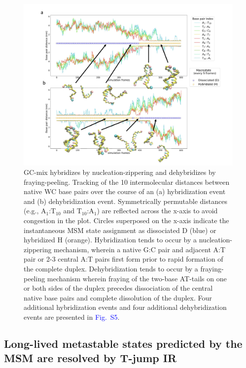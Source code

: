 \documentclass[journal=jpcbfk,manuscript=article]{achemso}
\newcommand*{\blauw}[1]{\textcolor{blue}{#1}}
\begin{document}
\begin{figure}[ht!]
	\begin{center}
	\includegraphics[width=180mm, scale=1]{Fig4.pdf}
        \caption{GC-mix hybridizes by nucleation-zippering and dehybridizes by fraying-peeling. Tracking of the 10 intermolecular distances between native WC base pairs over the course of an (a) hybridization event and (b) dehybridization event. Symmetrically permutable distances (e.g., A$_1$:T$_{10}$ and T$_{10}$:A$_1$) are reflected across the x-axis to avoid congestion in the plot. Circles superposed on the x-axis indicate the instantaneous MSM state assignment as dissociated D (blue) or hybridized H (orange). Hybridization tends to occur by a nucleation-zippering mechanism, wherein a native G:C pair and adjacent A:T pair or 2-3 central A:T pairs first form prior to rapid formation of the complete duplex. Dehybridization tends to occur by a fraying-peeling mechanism wherein fraying of the two-base AT-tails on one or both sides of the duplex precedes dissociation of the central native base pairs and complete dissolution of the duplex. Four additional hybridization events and four additional dehybridization events are presented in \blauw{Fig.~S5}.
        }
        \label{fig:GC-mix_transitions}
	\end{center}
\end{figure}


\subsection{\label{sec:stretch_comparison}Long-lived metastable states predicted by the MSM are resolved by T-jump IR}
\end{document}
